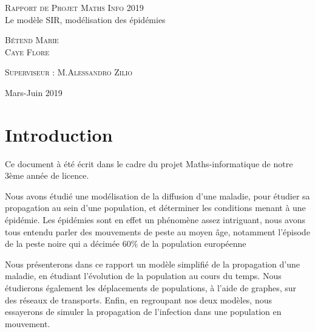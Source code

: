 \documentclass[a4paper]{article}
\theoremstyle{plain}
\theoremstyle{definition}
\theoremstyle{remark}
\begin{document}
\begin{titlepage}
  \begin{sffamily}
	\begin{center}
	
		\textsc{\Large Rapport de Projet Maths Info 2019}\\
		\vspace{9.5cm}
		{ \huge  Le modèle SIR, modélisation des épidémies\\[0.4cm] }
		
		\vspace{10cm}
		\begin{minipage}{0.4\textwidth}
			\begin{flushleft} \large
				\textsc{Bétend Marie}\\
				\textsc{Caye Flore}\\
			\end{flushleft}
		\end{minipage}
		\begin{minipage}{0.4\textwidth}
			\begin{flushright} \large
				\textsc{Superviseur : M.Alessandro Zilio}
			\end{flushright}
		\end{minipage}
		
		\vfill
		
		{\large 	Mars-Juin 2019}
		
	\end{center}
\end{sffamily}
\end{titlepage}
\tableofcontents
\newpage
\section{Introduction}

Ce document à été écrit dans le cadre du projet Maths-informatique de notre 3ème année de licence.

Nous avons étudié une modélisation de la diffusion d'une maladie, pour étudier sa propagation au sein d'une population, et déterminer les conditions menant à une épidémie.
Les épidémies sont en effet un phénomène assez intriguant, nous avons tous entendu parler des mouvements de peste au moyen âge, notamment l'épisode de la peste noire qui a décimée 60\% de la population européenne %

Nous présenterons dans ce rapport un modèle simplifié de la propagation d'une maladie, en étudiant l'évolution de la population au cours du temps. Nous étudierons  également les déplacements de populations, à l'aide de graphes, sur des réseaux de transports. Enfin, en regroupant nos deux modèles, nous essayerons de simuler la propagation de l'infection  dans une population en mouvement.
\end{document}
